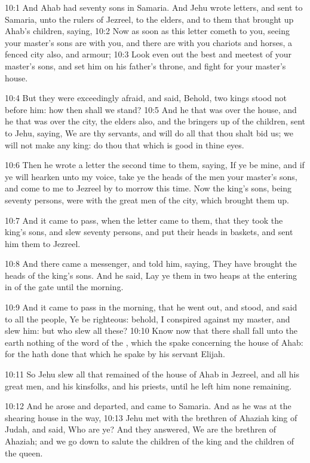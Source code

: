 10:1 And Ahab had seventy sons in Samaria. And Jehu wrote letters, and
sent to Samaria, unto the rulers of Jezreel, to the elders, and to
them that brought up Ahab's children, saying, 10:2 Now as soon as this
letter cometh to you, seeing your master's sons are with you, and
there are with you chariots and horses, a fenced city also, and
armour; 10:3 Look even out the best and meetest of your master's sons,
and set him on his father's throne, and fight for your master's house.

10:4 But they were exceedingly afraid, and said, Behold, two kings
stood not before him: how then shall we stand?  10:5 And he that was
over the house, and he that was over the city, the elders also, and
the bringers up of the children, sent to Jehu, saying, We are thy
servants, and will do all that thou shalt bid us; we will not make any
king: do thou that which is good in thine eyes.

10:6 Then he wrote a letter the second time to them, saying, If ye be
mine, and if ye will hearken unto my voice, take ye the heads of the
men your master's sons, and come to me to Jezreel by to morrow this
time. Now the king's sons, being seventy persons, were with the great
men of the city, which brought them up.

10:7 And it came to pass, when the letter came to them, that they took
the king's sons, and slew seventy persons, and put their heads in
baskets, and sent him them to Jezreel.

10:8 And there came a messenger, and told him, saying, They have
brought the heads of the king's sons. And he said, Lay ye them in two
heaps at the entering in of the gate until the morning.

10:9 And it came to pass in the morning, that he went out, and stood,
and said to all the people, Ye be righteous: behold, I conspired
against my master, and slew him: but who slew all these?  10:10 Know
now that there shall fall unto the earth nothing of the word of the
\LORD, which the \LORD spake concerning the house of Ahab: for the \LORD
hath done that which he spake by his servant Elijah.

10:11 So Jehu slew all that remained of the house of Ahab in Jezreel,
and all his great men, and his kinsfolks, and his priests, until he
left him none remaining.

10:12 And he arose and departed, and came to Samaria. And as he was at
the shearing house in the way, 10:13 Jehu met with the brethren of
Ahaziah king of Judah, and said, Who are ye? And they answered, We are
the brethren of Ahaziah; and we go down to salute the children of the
king and the children of the queen.

